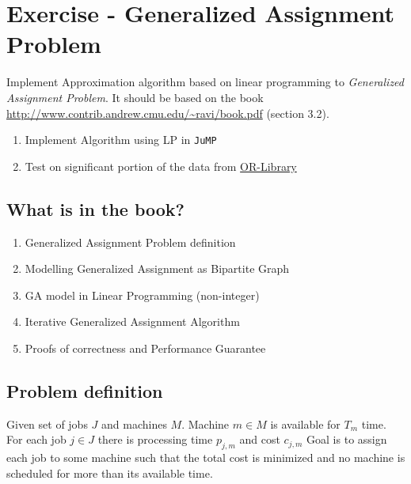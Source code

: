 \section{Exercise - Generalized Assignment Problem}
Implement Approximation algorithm based on linear programming to \textit{Generalized Assignment Problem}.
It should be based on the book \url{http://www.contrib.andrew.cmu.edu/~ravi/book.pdf} (section 3.2).

\begin{enumerate}
    \item Implement  Algorithm using LP in \texttt{JuMP} \notdone
    \item Test on significant portion of the data from \href{https://people.brunel.ac.uk/~mastjjb/jeb/info.html}{OR-Library} \done
\end{enumerate}

\subsection{What is in the book?}
\begin{enumerate}
    \item Generalized Assignment Problem definition
    \item Modelling Generalized Assignment as Bipartite Graph
    \item GA model in Linear Programming (non-integer)
    \item Iterative Generalized Assignment Algorithm
    \item Proofs of correctness and Performance Guarantee
\end{enumerate}

\subsection{Problem definition}
Given set of jobs $J$ and machines $M$. Machine $m \in M$ is available for $T_m$ time.
For each job $j \in J$ there is processing time $p_{j,m}$ and cost $c_{j,m}$
Goal is to assign each job to some machine such that the total cost is minimized and no machine is scheduled for more than its available time.


